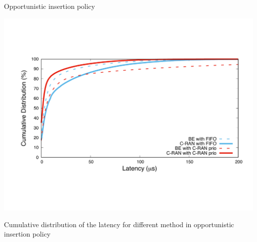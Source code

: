 \documentclass[10 pt]{beamer}
\begin{document}
\begin{frame}{Opportunistic insertion policy }

\centering
\includegraphics[scale=0.4]{opport}

 Cumulative distribution of the latency for different method in opportunistic insertion policy

\end{frame}
\end{document}
